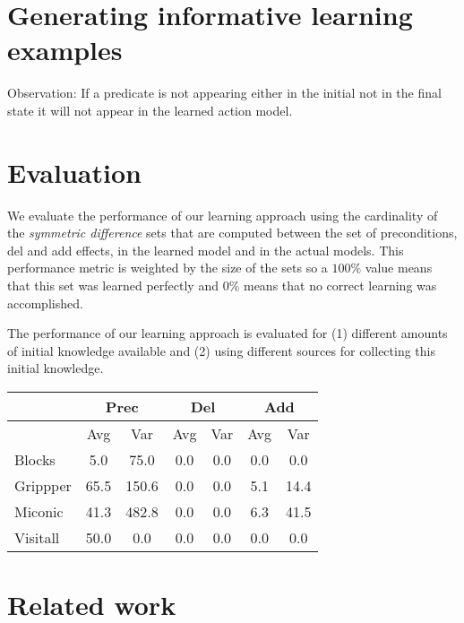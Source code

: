 \documentclass[letterpaper]{article} %
\begin{document}
\section{Generating informative learning examples}
Observation: If a predicate is not appearing either in the initial not in the final state it will not appear in the learned action model. 


\section{Evaluation}
We evaluate the performance of our learning approach using the cardinality of the {\em symmetric difference} sets that are computed between the set of preconditions, del and add effects, in the learned model and in the actual models. This performance metric is weighted by the size of the sets so a $100\%$ value means that this set was learned perfectly and $0\%$ means that no correct learning was accomplished.

The performance of our learning approach is evaluated for (1) different amounts of initial knowledge available and (2) using different sources for collecting this initial knowledge.

\begin{tabular}{l|cc|cc|cc}
 & \multicolumn{2}{c|}{Prec} & \multicolumn{2}{c|}{Del} & \multicolumn{2}{c}{Add} \\\hline
& Avg & Var & Avg & Var & Avg & Var\\\hline
Blocks & 5.0 & 75.0 & 0.0 & 0.0 & 0.0 & 0.0\\
Grippper& 65.5 & 150.6 & 0.0 & 0.0 & 5.1 & 14.4 \\
Miconic& 41.3 & 482.8 & 0.0 & 0.0 & 6.3 & 41.5\\
Visitall& 50.0 & 0.0 & 0.0 & 0.0 & 0.0 & 0.0
\end{tabular}


\section{Related work}
\end{document}

